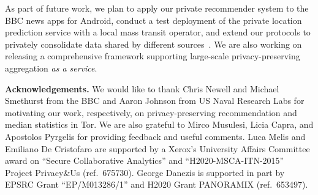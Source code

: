 \documentclass[conference]{IEEEtran}
\newcommand{\descr}[1]{\medskip \noindent \textbf{#1}}
\begin{document}
As part of future work, we plan to apply our private recommender system to the BBC news apps for Android, conduct a test deployment of the private location prediction service with a local mass transit operator, and extend our protocols to privately consolidate data shared by different sources~\cite{freudiger2015controlled}. We are also working on releasing a comprehensive framework supporting large-scale privacy-preserving aggregation {\em as a service}. 

\descr{Acknowledgements.} 
We would like to thank Chris Newell and Michael Smethurst from the BBC and Aaron Johnson from US Naval Research Labs for motivating our work, respectively, on privacy-preserving recommendation and median statistics in Tor.
We are also grateful to Mirco Musulesi, Licia Capra, and Apostolos Pyrgelis for providing feedback and useful comments. Luca Melis and Emiliano De Cristofaro are supported by a Xerox's University Affairs Committee award on ``Secure Collaborative Analytics'' and ``H2020-MSCA-ITN-2015'' Project Privacy{\&}Us (ref.\ 675730). George Danezis is supported in part by EPSRC Grant ``EP/M013286/1'' and H2020 Grant PANORAMIX (ref.\ 653497).
\end{document}

